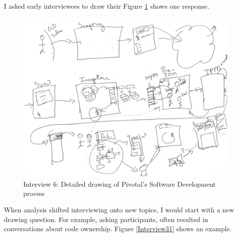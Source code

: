 I asked early interviewees to draw their  Figure \ref{2015_08_12_detailed} shows one response. 
\begin{figure}[htbp]
\centering
\includegraphics[width=\oneColumnWidth{}]{drawings/2015_08_12_anchor.png}
\caption{Interview 6: Detailed drawing of Pivotal's Software Development process}
\label{2015_08_12_detailed}
\end{figure}

When analysis shifted interviewing onto new topics, I would start with a new drawing question. For example, asking participants,  often resulted in conversations about code ownership. Figure \ref{Interview31} shows an example. 

